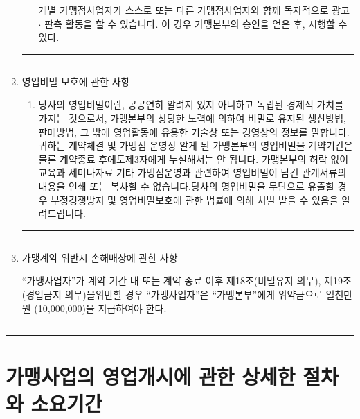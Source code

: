 \documentclass[a5paper,10pt]{oblivoir}
\newcommand\crule[3][black]{\textcolor{#1}{\rule{#2}{#3}}}
\begin{document}
\begin{enumerate}
\begin{enumerate}
개별 가맹점사업자가 스스로 또는 다른 가맹점사업자와 함께 독자적으로 광고  $\cdot$ 판촉 활동을 할 수 있습니다. 이 경우 가맹본부의 승인을 얻은 후, 시행할 수 있다.
\end{enumerate}
\newpage
\begin{center}
\crule[red]{4cm}{0.1cm} \crule[blue]{4cm}{0.1cm}
\end{center}
\item  영업비밀 보호에 관한 사항
\begin{enumerate}
\item[]당사의 영업비밀이란, 공공연히 알려져 있지 아니하고 독립된 경제적 가치를 가지는 것으로서, 가맹본부의 상당한 노력에 의하여 비밀로 유지된 생산방법, 판매방법, 그 밖에 영업활동에 유용한 기술상 또는 경영상의 정보를 말합니다.귀하는 계약체결 및 가맹점 운영상 알게 된 가맹본부의 영업비밀을 계약기간은 물론 계약종료 후에도제3자에게 누설해서는 안 됩니다. 가맹본부의 허락 없이 교육과 세미나자료 기타 가맹점운영과 관련하여 영업비밀이 담긴 관계서류의 내용을 인쇄 또는 복사할 수 없습니다.당사의 영업비밀을 무단으로 유출할 경우 부정경쟁방지 및 영업비밀보호에 관한 법률에 의해 처벌 받을 수 있음을 알려드립니다.
\end{enumerate}
\newpage
\begin{center}
\crule[red]{4cm}{0.1cm} \crule[blue]{4cm}{0.1cm}
\end{center}
\item 가맹계약 위반시 손해배상에 관한 사항

“가맹사업자”가 계약 기간 내 또는 계약 종료 이후 제18조(비밀유지 의무), 제19조(경업금지 의무)을위반할 경우 “가맹사업자”은 “가맹본부”에게 위약금으로 일천만원 (10,000,000)을 지급하여야 한다.
\end{enumerate}

\newpage
\begin{center}
\crule[red]{4cm}{0.1cm} \crule[blue]{4cm}{0.1cm}
\end{center}
\section{ 가맹사업의 영업개시에 관한 상세한 절차와 소요기간}
\end{document}
